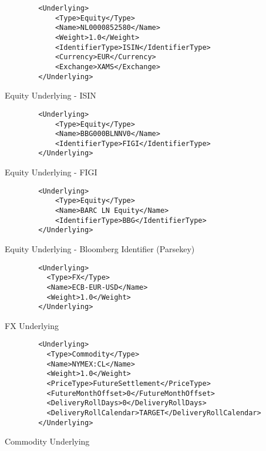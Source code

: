 \begin{listing}[H]
\begin{verbatim}
        <Underlying>
            <Type>Equity</Type>
            <Name>NL0000852580</Name>
            <Weight>1.0</Weight>
            <IdentifierType>ISIN</IdentifierType>
            <Currency>EUR</Currency>
            <Exchange>XAMS</Exchange>
        </Underlying>
\end{verbatim}
\caption{Equity Underlying - ISIN}
\label{lst:equnderlyingisin}
\end{listing}

\begin{listing}[H]
\begin{verbatim}
        <Underlying>
            <Type>Equity</Type>
            <Name>BBG000BLNNV0</Name>
            <IdentifierType>FIGI</IdentifierType>
        </Underlying>
\end{verbatim}
\caption{Equity Underlying - FIGI}
\label{lst:equnderlyingfigi}
\end{listing}

\begin{listing}[H]
\begin{verbatim}
        <Underlying>
            <Type>Equity</Type>
            <Name>BARC LN Equity</Name>
            <IdentifierType>BBG</IdentifierType>
        </Underlying>
\end{verbatim}
\caption{Equity Underlying - Bloomberg Identifier (Parsekey)}
\label{lst:equnderlyingbbg}
\end{listing}

\begin{listing}[H]
\begin{verbatim}
        <Underlying>
          <Type>FX</Type>
          <Name>ECB-EUR-USD</Name>
          <Weight>1.0</Weight>
        </Underlying>
\end{verbatim}
\caption{FX Underlying}
\label{lst:fxunderlying}
\end{listing}

\begin{listing}[H]
\begin{verbatim}
        <Underlying>
          <Type>Commodity</Type>
          <Name>NYMEX:CL</Name>
          <Weight>1.0</Weight>
          <PriceType>FutureSettlement</PriceType>
          <FutureMonthOffset>0</FutureMonthOffset>
          <DeliveryRollDays>0</DeliveryRollDays>
          <DeliveryRollCalendar>TARGET</DeliveryRollCalendar>
        </Underlying>
\end{verbatim}
\caption{Commodity Underlying}
\label{lst:communderlying}
\end{listing}

